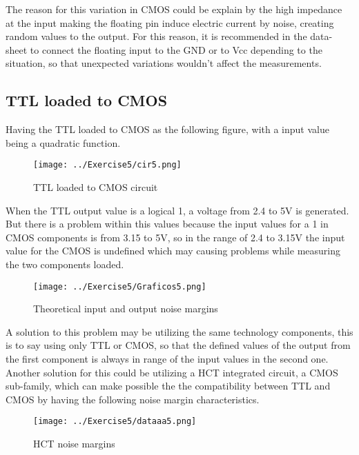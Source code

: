The reason for this variation in CMOS could be explain by the high impedance at the input making the floating pin induce electric current by noise, creating random values to the output. For this reason, it is recommended in the data-sheet to connect the floating input to the GND or to Vcc depending to the situation, so that unexpected variations wouldn't affect the measurements.

\subsection{\color{purple}TTL loaded to CMOS}

Having the TTL loaded to CMOS as the following figure, with a input value being a quadratic function. 

\begin{figure}[h!]
        \centering
        \texttt{[image: ../Exercise5/cir5.png]}
        \caption{\color{cyan}TTL loaded to CMOS circuit}
        \label{fig:ej5cir}
\end{figure}


When the TTL output value is a logical 1, a voltage from 2.4 to 5V is generated. But there is a problem within this values because the input values for a 1 in CMOS components is from 3.15 to 5V, so in the range of 2.4 to 3.15V the input value for the CMOS is undefined which may causing problems while measuring the two components loaded.

\begin{figure}[h!]
        \centering
        \texttt{[image: ../Exercise5/Graficos5.png]}
        \caption{\color{cyan}Theoretical input and output noise margins}
        \label{fig:ej5noisemargin}
\end{figure}

A solution to this problem may be utilizing the same technology components, this is to say using only TTL or CMOS, so that the defined values of the output from the first component is always in range of the input values in the second one. Another solution for this could be utilizing a HCT integrated circuit, a CMOS sub-family, which can make possible the the compatibility between TTL and CMOS by having the following noise margin characteristics. 

\begin{figure}[h!]
        \centering
        \texttt{[image: ../Exercise5/dataaa5.png]}
        \caption{\color{cyan}HCT noise margins}
        \label{fig:ej5noisemargin}
\end{figure}


%